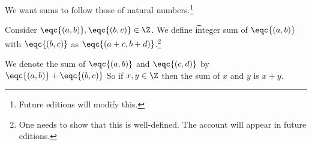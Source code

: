 

We want sums to follow those of natural numbers.\footnote{Future editions will modify this.}


Consider $\eqc{(a, b)}, \eqc{(b, c)} \in \Z$.
We define \t{integer sum} of $\eqc{(a, b)}$ with $\eqc{(b, c)}$ as $\eqc{(a + c, b + d)}$.\footnote{One needs to show that this is well-defined. The account will appear in future editions.}


We denote the sum of $\eqc{(a, b)}$ and $\eqc{(c, d)}$ by $\eqc{(a, b)} + \eqc{(b, c)}$
So if $x, y \in \Z$ then the sum of $x$ and $y$ is $x + y$.

\blankpage

